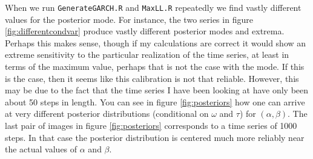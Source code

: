 \documentclass{article}
\begin{document}
\begin{description}
When we run \texttt{GenerateGARCH.R} and \texttt{MaxLL.R} repeatedly we find vastly different values for the posterior mode.  For instance, the two series in figure \ref{fig:differentcondvar} produce vastly different posterior modes and extrema.  Perhaps this makes sense, though if my calculations are correct it would show an extreme sensitivity to the particular realization of the time series, at least in terms of the maximum value, perhaps that is not the case with the mode.  If this is the case, then it seems like this calibration is not that reliable.  However, this may be due to the fact that the time series I have been looking at have only been about 50 steps in length.  You can see in figure \ref{fig:posteriors} how one can arrive at very different posterior distributions (conditional on $\omega$ and $\tau$) for $(\alpha, \beta)$.  The last pair of images in figure \ref{fig:posteriors} corresponds to a time series of 1000 steps.  In that case the posterior distribution is centered much more reliably near the actual values of $\alpha$ and $\beta$.

\begin{comment}
\begin{figure}[!h]
\begin{center}
\end{center}
\caption{Two different conditional variance time series.  The red series produces a maximum (of the negative log likelihood) of 70.  The blue series prodcuces a maximum of -17.}
\label{fig:differentcondvar}
\end{figure}

\begin{figure}[!h]
\begin{center}




\end{center}
\caption{Each pair of images is a time series and a posterior distribution for $\theta = (\alpha, \beta, \omega^*)$ where we have fixed $\omega^*$ to be the value of $\omega$ at the posterior mode.  Thus these are joint posterior distributions in $(\alpha, \beta)$ conditioned on $\omega = \omega^*$ and $\tau = 1$.  The first three pairs correspond to time series with 50 steps.  The last pair corresponds to a time series with 1000 steps.  The true values of our parameters are $\alpha = 2.0, \; \beta = 6.0, \; \omega = 1.0$.  We have fixed $\tau = 1$.}
\label{fig:posteriors}
\end{figure}
\end{comment}


\end{description}
\end{document}
